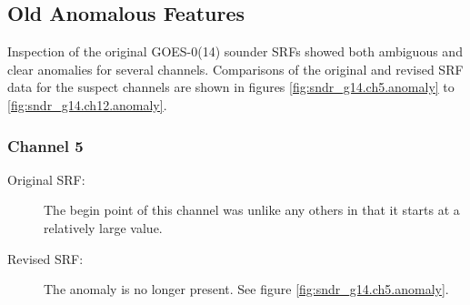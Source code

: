 \subsection{Old Anomalous Features}
Inspection of the original GOES-0(14) sounder SRFs showed both ambiguous and clear anomalies for several channels. Comparisons of the original and revised SRF data for the suspect channels are shown in figures \ref{fig:sndr_g14.ch5.anomaly} to \ref{fig:sndr_g14.ch12.anomaly}.

\subsubsection{Channel 5}
\begin{description}
  \item[Original SRF:] The begin point of this channel was unlike any others in that it starts at a relatively large value.
  \item[Revised SRF:]  The anomaly is no longer present. See figure \ref{fig:sndr_g14.ch5.anomaly}.
\end{description}

